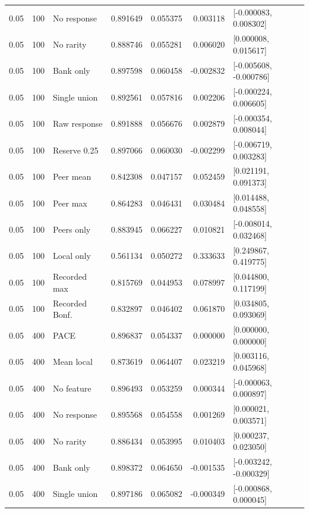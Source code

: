 {\begin{longtable}{rrlrrrrl}
0.05 & 100 & No response & 0.891649 & 0.055375 & 0.003118 & \multicolumn{2}{l}{[-0.000083, 0.008302]}\\
0.05 & 100 & No rarity & 0.888746 & 0.055281 & 0.006020 & \multicolumn{2}{l}{[0.000008, 0.015617]}\\
0.05 & 100 & Bank only & 0.897598 & 0.060458 & -0.002832 & \multicolumn{2}{l}{[-0.005608, -0.000786]}\\
0.05 & 100 & Single union & 0.892561 & 0.057816 & 0.002206 & \multicolumn{2}{l}{[-0.000224, 0.006605]}\\
0.05 & 100 & Raw response & 0.891888 & 0.056676 & 0.002879 & \multicolumn{2}{l}{[-0.000354, 0.008044]}\\
0.05 & 100 & Reserve 0.25 & 0.897066 & 0.060030 & -0.002299 & \multicolumn{2}{l}{[-0.006719, 0.003283]}\\
0.05 & 100 & Peer mean & 0.842308 & 0.047157 & 0.052459 & \multicolumn{2}{l}{[0.021191, 0.091373]}\\
0.05 & 100 & Peer max & 0.864283 & 0.046431 & 0.030484 & \multicolumn{2}{l}{[0.014488, 0.048558]}\\
0.05 & 100 & Peers only & 0.883945 & 0.066227 & 0.010821 & \multicolumn{2}{l}{[-0.008014, 0.032468]}\\
0.05 & 100 & Local only & 0.561134 & 0.050272 & 0.333633 & \multicolumn{2}{l}{[0.249867, 0.419775]}\\
0.05 & 100 & Recorded max & 0.815769 & 0.044953 & 0.078997 & \multicolumn{2}{l}{[0.044800, 0.117199]}\\
0.05 & 100 & Recorded Bonf. & 0.832897 & 0.046402 & 0.061870 & \multicolumn{2}{l}{[0.034805, 0.093069]}\\
\midrule
0.05 & 400 & PACE & 0.896837 & 0.054337 & 0.000000 & \multicolumn{2}{l}{[0.000000, 0.000000]}\\
0.05 & 400 & Mean local & 0.873619 & 0.064407 & 0.023219 & \multicolumn{2}{l}{[0.003116, 0.045968]}\\
0.05 & 400 & No feature & 0.896493 & 0.053259 & 0.000344 & \multicolumn{2}{l}{[-0.000063, 0.000897]}\\
0.05 & 400 & No response & 0.895568 & 0.054558 & 0.001269 & \multicolumn{2}{l}{[0.000021, 0.003571]}\\
0.05 & 400 & No rarity & 0.886434 & 0.053995 & 0.010403 & \multicolumn{2}{l}{[0.000237, 0.023050]}\\
0.05 & 400 & Bank only & 0.898372 & 0.064650 & -0.001535 & \multicolumn{2}{l}{[-0.003242, -0.000329]}\\
0.05 & 400 & Single union & 0.897186 & 0.065082 & -0.000349 & \multicolumn{2}{l}{[-0.000868, 0.000045]}\\

\end{longtable}}
